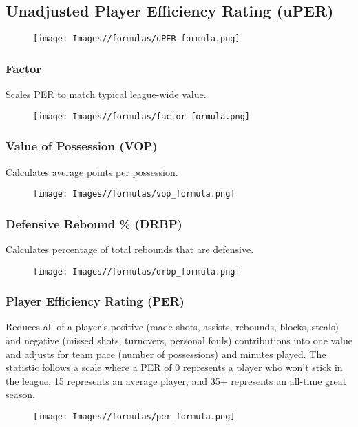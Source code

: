 \documentclass{article}
\begin{document}
\subsection{Unadjusted Player Efficiency Rating (uPER)}
\begin{figure}[H]
    \centering
    \texttt{[image: Images//formulas/uPER\_formula.png]}
    \label{fig:formula-3}
\end{figure}

\subsubsection{Factor}
Scales PER to match typical league-wide value.
\begin{figure}[H]
    \centering
    \texttt{[image: Images//formulas/factor\_formula.png]}
    \label{fig:formula-4}
\end{figure}

\subsubsection{Value of Possession (VOP)}
Calculates average points per possession.
\begin{figure}[H]
    \centering
    \texttt{[image: Images//formulas/vop\_formula.png]}
    \label{fig:formula-5}
\end{figure}

\subsubsection{Defensive Rebound \% (DRBP)}
Calculates percentage of total rebounds that are defensive.
\begin{figure}[H]
    \centering
    \texttt{[image: Images//formulas/drbp\_formula.png]}
    \label{fig:formula-6}
\end{figure}

\subsubsection{Player Efficiency Rating (PER)}
Reduces all of a player’s positive (made shots, assists, rebounds, blocks, steals) and negative (missed shots, turnovers, personal fouls) contributions into one value and adjusts for team pace (number of possessions) and minutes played.
The statistic follows a scale where a PER of 0 represents a player who won’t stick in the league, 15 represents an average player, and 35+ represents an all-time great season.
\begin{figure}[H]
    \centering
    \texttt{[image: Images//formulas/per\_formula.png]}
    \label{fig:formula-7}
\end{figure}
\end{document}
